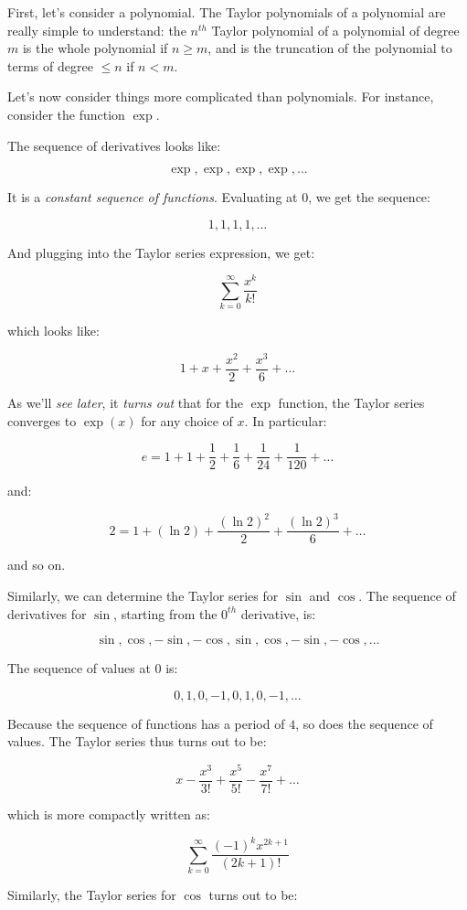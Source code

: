 \documentclass{amsart}
\begin{document}
First, let's consider a polynomial. The Taylor polynomials of a
polynomial are really simple to understand: the $n^{th}$ Taylor
polynomial of a polynomial of degree $m$ is the whole polynomial if $n
\ge m$, and is the truncation of the polynomial to terms of degree $\le
n$ if $n < m$.

Let's now consider things more complicated than polynomials. For
instance, consider the function $\exp$.

The sequence of derivatives looks like:

$$\exp, \exp, \exp, \exp, \dots$$

It is a {\em constant sequence of functions}. Evaluating at $0$, we
get the sequence:

$$1,1,1,1,\dots$$

And plugging into the Taylor series expression, we get:

$$\sum_{k=0}^\infty \frac{x^k}{k!}$$

which looks like:

$$1 + x + \frac{x^2}{2} + \frac{x^3}{6} + \dots$$

As we'll {\em see later}, it {\em turns out} that for the $\exp$ function,
the Taylor series converges to $\exp(x)$ for any choice of $x$. In
particular:

$$e = 1 + 1 + \frac{1}{2} + \frac{1}{6} + \frac{1}{24} + \frac{1}{120} + \dots$$

and:

$$2 = 1 + (\ln 2) + \frac{(\ln 2)^2}{2} + \frac{(\ln 2)^3}{6} + \dots$$

and so on.

Similarly, we can determine the Taylor series for $\sin$ and
$\cos$. The sequence of derivatives for $\sin$, starting from the
$0^{th}$ derivative, is:

$$\sin, \cos, -\sin, -\cos, \sin, \cos, -\sin, -\cos, \dots$$

The sequence of values at $0$ is:

$$0, 1, 0, -1, 0, 1, 0, -1, \dots$$

Because the sequence of functions has a period of $4$, so does the
sequence of values. The Taylor series thus turns out to be:

$$x - \frac{x^3}{3!} + \frac{x^5}{5!} - \frac{x^7}{7!} + \dots$$

which is more compactly written as:

$$\sum_{k=0}^\infty \frac{(-1)^kx^{2k + 1}}{(2k + 1)!}$$

Similarly, the Taylor series for $\cos$ turns out to be:
\end{document}
